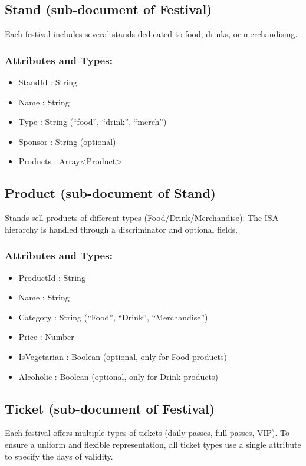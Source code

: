 \documentclass[11pt,a4paper]{report}
\begin{document}
\subsection{Stand (sub-document of Festival)}
Each festival includes several stands dedicated to food, drinks, or merchandising.

\subsubsection{Attributes and Types:}

\begin{itemize}
    \item StandId : String
    \item Name : String
    \item Type : String (“food”, “drink”, “merch”)
    \item Sponsor : String (optional)
    \item Products : Array<Product>
\end{itemize}

\subsection{Product (sub-document of Stand)}
Stands sell products of different types (Food/Drink/Merchandise). The ISA hierarchy is handled through a discriminator and optional fields.

\subsubsection{Attributes and Types:}
\begin{itemize}
    \item ProductId : String
    \item Name : String
    \item Category : String (“Food”, “Drink”, “Merchandise”)
    \item Price : Number
    \item IsVegetarian : Boolean (optional, only for Food products)
    \item Alcoholic : Boolean (optional, only for Drink products)
\end{itemize}

\subsection{Ticket (sub-document of Festival)}

Each festival offers multiple types of tickets (daily passes, full passes, VIP).  
To ensure a uniform and flexible representation, all ticket types use a single attribute to specify the days of validity.
\end{document}
